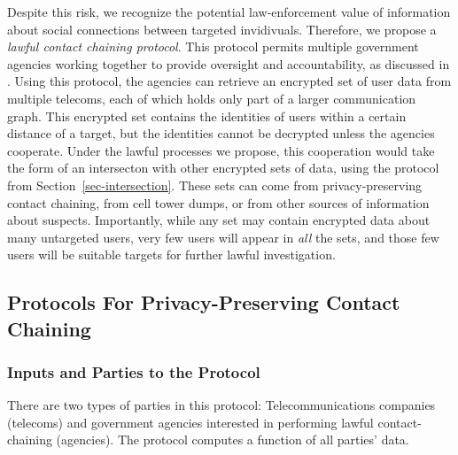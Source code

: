 Despite this risk, we recognize the potential law-enforcement value of information about social connections between targeted invidivuals. Therefore, we propose a \emph{lawful contact chaining protocol}. This protocol permits multiple government agencies working together to provide oversight and accountability, as discussed in \cite{sff-foci2014}. Using this protocol, the agencies can retrieve an encrypted set of user data from multiple telecoms, each of which holds only part of a larger communication graph. This encrypted set contains the identities of users within a certain distance of a target, but the identities cannot be decrypted unless the agencies cooperate. Under the lawful processes we propose, this cooperation would take the form of an intersecton with other encrypted sets of data, using the protocol from Section~\ref{sec-intersection}. These sets can come from privacy-preserving contact chaining, from cell tower dumps, or from other sources of information about suspects. Importantly, while any set may contain encrypted data about many untargeted users, very few users will appear in \emph{all} the sets, and those few users will be suitable targets for further lawful investigation.



\subsection{Protocols For Privacy-Preserving Contact Chaining}

\label{sec:proto}






\subsubsection{Inputs and Parties to the Protocol}



There are two types of parties in this protocol: Telecommunications companies (telecoms) and government agencies interested in performing lawful contact-chaining (agencies). The protocol computes a function of all parties' data.



